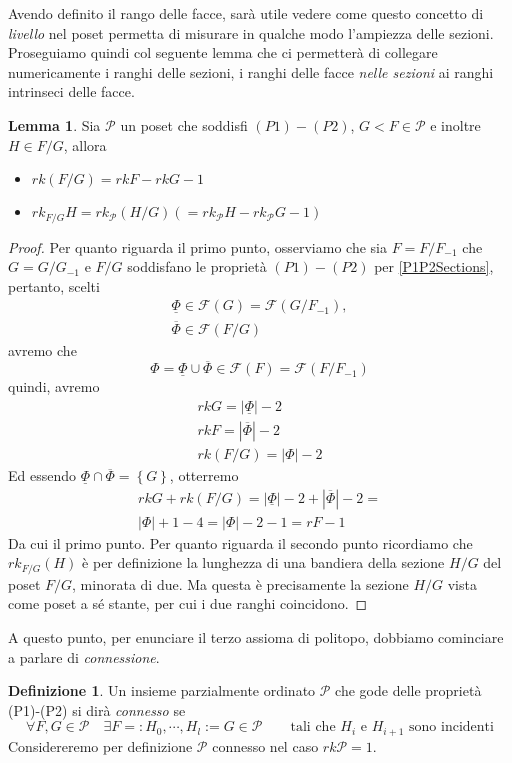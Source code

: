 \documentclass[a4paper,12pt]{report}
\newcommand{\p}{\mathcal{P}}
\theoremstyle{plain}
\theoremstyle{definition}
\newtheorem{defin}[teo]{Definizione}
\newtheorem{lem}[teo]{Lemma}
\begin{document}
Avendo definito il rango delle facce, sar\`a utile vedere come questo concetto di \emph{livello} nel poset permetta
di misurare in qualche modo l'ampiezza delle sezioni.
Proseguiamo quindi col seguente lemma che ci permetter\`a di collegare numericamente i ranghi delle sezioni, i ranghi delle facce \emph{nelle sezioni}
ai ranghi intrinseci delle facce.
\begin{lem}
\label{lem:SectionRanks}
Sia $\p$ un poset che soddisfi $(P1)-(P2)$, $G<F\in\p$ e inoltre $H\in F/G$, allora
\begin{itemize}
\item $rk(F/G)=rkF-rkG-1$
\item $rk_{F/G}H=rk_\p(H/G)(=rk_\p H-rk_\p G-1)$
\end{itemize}
\end{lem}
\begin{proof}
Per quanto riguarda il primo punto, osserviamo che sia $F=F/F_{-1}$ che $G=G/G_{-1}$ e $F/G$ soddisfano le propriet\`a $(P1)-(P2)$ per
\ref{P1P2Sections}, pertanto, scelti
\begin{gather*}
\underline{\Phi}\in\mathcal{F}(G)=\mathcal{F}(G/F_{-1}),\\
\overline{\Phi}\in\mathcal{F}(F/G)
\end{gather*}
avremo che
\begin{equation*}
\Phi=\underline{\Phi}\cup\overline{\Phi}\in\mathcal{F}(F)=\mathcal{F}(F/F_{-1})
\end{equation*}
quindi, avremo
\begin{gather*}
rkG=|\underline{\Phi}|-2\\
rkF=|\overline{\Phi}|-2\\
rk(F/G)=|\Phi|-2
\end{gather*}
Ed essendo $\underline{\Phi}\cap\overline{\Phi}=\left\{G\right\}$, otterremo
\begin{gather*}
rkG+rk(F/G)=|\underline{\Phi}|-2+|\overline{\Phi}|-2=\\
|\Phi|+1-4=|\Phi|-2-1=rF-1
\end{gather*}
Da cui il primo punto. Per quanto riguarda il secondo punto ricordiamo che $rk_{F/G}(H)$ \`e per definizione la lunghezza di una bandiera
della sezione $H/G$ del poset $F/G$, minorata di due. Ma questa \`e precisamente la sezione $H/G$ vista come poset a s\'e stante, per cui
i due ranghi coincidono.
\end{proof}
A questo punto, per enunciare il terzo assioma di politopo, dobbiamo cominciare a parlare di \emph{connessione}.
\begin{defin}
Un insieme parzialmente ordinato $\p$ che gode delle propriet\`a (P1)-(P2) si dir\`a \emph{connesso} se
\begin{equation*}
\forall F,G\in\p\quad\exists F=:H_0,\cdots,H_l:=G\in\p\qquad \text{tali che }H_i\text{ e }H_{i+1}\text{ sono incidenti}
\end{equation*}
Considereremo per definizione $\p$ connesso nel caso $rk\p=1$.
\end{defin}
\end{document}
